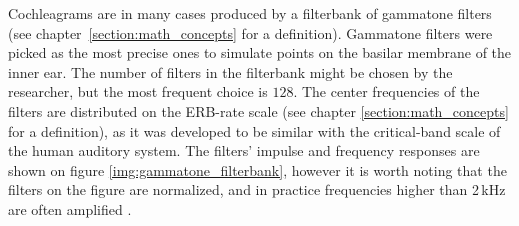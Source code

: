 Cochleagrams are in many cases produced by a filterbank of gammatone filters (see chap\-ter~\ref{section:math_concepts} for a definition). Gammatone filters were picked as the most precise ones to simulate points on the basilar membrane of the inner ear. The number of filters in the filterbank might be chosen by the researcher, but the most frequent choice is $128$. The center frequencies of the filters are distributed on the ERB-rate scale (see chapter \ref{section:math_concepts} for a definition), as it was developed to be similar with the critical-band scale of the human auditory system. The filters' impulse and frequency responses are shown on figure \ref{img:gammatone_filterbank}, however it is worth noting that the filters on the figure are normalized, and in practice frequencies higher than 2\,kHz are often amplified \cite{Wang2006}.\\

